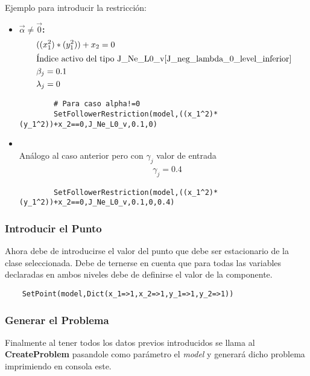 \begin{itemize}
Ejemplo para introducir la restricción:

\begin{itemize}
    \item \textbf{$\vec{\alpha}\neq \vec{0}$:}\\
    \begin{align*}
        &((x_1^2)*(y_1^2))+x_2=0\\
        &\text{Índice activo del tipo J\_Ne\_L0\_v} \refeq{J_neg_lambda_0_level_inferior}\\
        & \beta_j=0.1\\
        & \lambda_j=0 \\
    \end{align*}
    \begin{lstlisting}
        # Para caso alpha!=0
        SetFollowerRestriction(model,((x_1^2)*(y_1^2))+x_2==0,J_Ne_L0_v,0.1,0)
    \end{lstlisting}
    \item {}\\
    
    Análogo al caso anterior pero con $\gamma_j$ valor de entrada
    \begin{align*}
        &\gamma_j=0.4
    \end{align*}
    \begin{lstlisting}
        SetFollowerRestriction(model,((x_1^2)*(y_1^2))+x_2==0,J_Ne_L0_v,0.1,0,0.4)
    \end{lstlisting}
\end{itemize}

\end{itemize}


\subsubsection{Introducir el Punto}
Ahora debe de introducirse el valor del punto que debe ser estacionario de la clase seleccionada.
Debe de ternerse en cuenta que para todas las variables declaradas en ambos niveles debe de definirse el valor de la componente.

\begin{lstlisting}
    SetPoint(model,Dict(x_1=>1,x_2=>1,y_1=>1,y_2=>1))
\end{lstlisting}

\subsubsection{Generar el Problema}
Finalmente al tener todos los datos previos introducidos se llama al \textbf{CreateProblem} pasandole como parámetro el \textit{model} 
y generará dicho problema imprimiendo en consola este.

